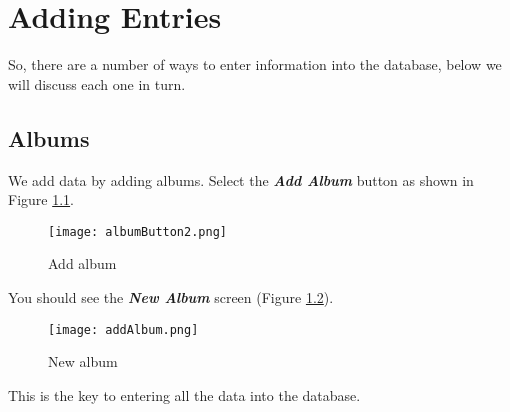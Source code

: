 \chapter{Adding Entries}
So, there are a number of ways to enter information into the database, below we will discuss each one in turn.
\section{Albums}
\label{sect:albums}
We add data by adding albums.  Select the 
\textit{\textbf{Add Album}}
button as shown in Figure 
\ref{fig:Add album}.
\begin{figure}[!h]
 \centering
 \texttt{[image: albumButton2.png]} 
 \caption{Add album}
 \label{fig:Add album}
\end{figure}
You should see the 
\textit{\textbf{New Album}}
screen (Figure 
\ref{fig:New album}).
\begin{figure}[!h]
 \centering
 \texttt{[image: addAlbum.png]}
 \caption{New album}
 \label{fig:New album}
\end{figure} 
This is the key to entering all the data into the database.
\newpage
